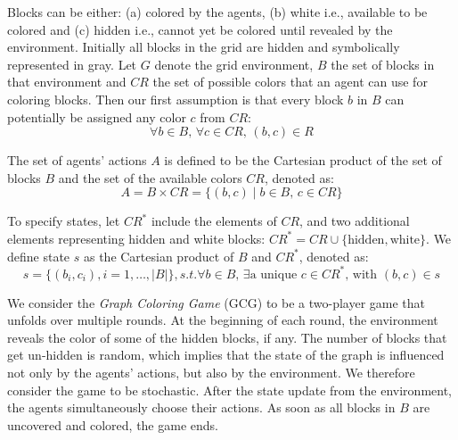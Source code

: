 \begin{flushleft}
\begin{flushleft}
        Blocks can be either: (a) colored by the agents, (b) white i.e., available to be colored and (c) hidden i.e., cannot yet be colored until revealed by the environment. Initially all blocks in the grid are hidden and symbolically represented in gray. Let $G$ denote the grid environment, $B$ the set of blocks in that environment and $CR$ the set of possible colors that an agent can use for coloring blocks. Then our first assumption is that every block $b$ in $B$ can potentially be assigned any color $c$ from $CR$:
        \begin{equation}
            \forall b \in B, \, \forall c \in CR, \, (b, c) \in R 
            \label{eq:bc}
        \end{equation}

        The set of agents' actions $A$ is defined to be the Cartesian product of the set of blocks $B$ and the set of the available colors $CR$, denoted as:
        \begin{equation}
            A = B \times CR = \{(b, c) \mid b \in B, \, c \in CR\} 
            \label{eq:action_space}
        \end{equation}

        To specify states, let $CR^*$ include the elements of $CR$, and two additional elements representing hidden and white blocks: $CR^* = CR \cup \{\text{hidden}, \text{white}\}$. We define state $s$ as the Cartesian product of $B$ and $CR^*$, denoted as:
        \begin{equation}
            s = \{(b_i, c_i), i=1, \dots, |B|\}, s.t. \forall b \in B, \, \exists \text{a unique } c \in CR^*\text{, with } (b,c) \in s
            \label{eq:state}
        \end{equation}

        We consider the \emph{Graph Coloring Game} (GCG) to be a two-player game that unfolds over multiple rounds. At the beginning of each round, the environment reveals the color of some of the hidden blocks, if any. The number of blocks that get un-hidden is random, which implies that the state of the graph is influenced not only by the agents' actions, but also by the environment. We therefore consider the game to be stochastic. After the state update from the environment, the agents simultaneously choose their actions. As soon as all blocks in $B$ are uncovered and colored, the game ends.
    
    \end{flushleft}


\end{flushleft}
